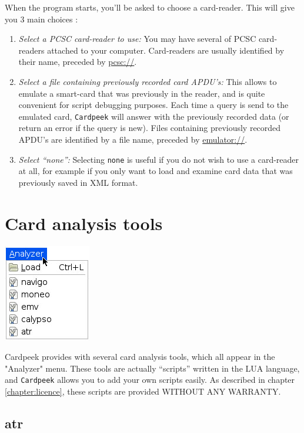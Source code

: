 \documentclass[11pt]{report}
\begin{document}
When the program starts, you'll be asked to choose a card-reader. 
This will give you 3 main choices :
\begin{enumerate}
\item{\emph{Select a PCSC card-reader to use:}
  You may have several of PCSC card-readers attached to your computer.
      	  Card-readers are usually identified by their name, preceded by \url{pcsc://}.}
\item{\emph{Select a file containing previously recorded card APDU's:}
  This allows to emulate a smart-card that was previously in the reader, and is quite convenient for script debugging purposes.
	  Each time a query is send to the emulated card, \texttt{Cardpeek} will answer with the previously recorded data (or return an error if the query is new).
	  Files containing previously recorded APDU's are identified by a file name, preceded by \url{emulator://}.}
\item{\emph{Select ``none'':}
  Selecting \texttt{none} is useful if you do not wish to use a card-reader at all, for example if you only want to load and examine card data that was previously saved in XML format.}
\end{enumerate}

\chapter{Card analysis tools}

\begin{center}
\includegraphics[width=.25\textwidth]{graphics/sample-menu-analyzer.jpg}
\end{center}

Cardpeek provides with several card analysis tools, which all appear in the "Analyzer" menu. 
These tools are actually ``scripts'' written in the LUA language, and \texttt{Cardpeek} allows you to add your own scripts easily.
As described in chapter \ref{chapter:licence}, these scripts are provided WITHOUT ANY WARRANTY.

\section{atr}
\end{document}
